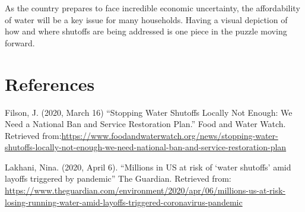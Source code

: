 \documentclass[
  12pt,
]{article}
\begin{document}
As the country prepares to face incredible economic uncertainty, the
affordability of water will be a key issue for many households. Having a
visual depiction of how and where shutoffs are being addressed is one
piece in the puzzle moving forward.

\newpage

\hypertarget{references}{%
\section{References}\label{references}}

Filson, J. (2020, March 16) ``Stopping Water Shutoffs Locally Not
Enough: We Need a National Ban and Service Restoration Plan.'' Food and
Water Watch. Retrieved
from:\url{https://www.foodandwaterwatch.org/news/stopping-water-shutoffs-locally-not-enough-we-need-national-ban-and-service-restoration-plan}

Lakhani, Nina. (2020, April 6). ``Millions in US at risk of `water
shutoffs' amid layoffs triggered by pandemic'' The Guardian. Retrieved
from:
\url{https://www.theguardian.com/environment/2020/apr/06/millions-us-at-risk-losing-running-water-amid-layoffs-triggered-coronavirus-pandemic}
\end{document}
